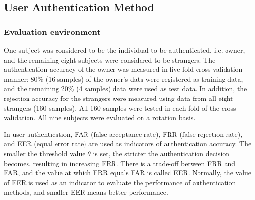 \documentclass[sigchi,authordraft]{acmart}
\begin{document}
\subsection{User Authentication Method}
\subsubsection{Evaluation environment}
One subject was considered to be the individual to be authenticated, i.e. owner, and the remaining eight subjects were considered to be strangers. The authentication accuracy of the owner was measured in five-fold cross-validation manner; 80\% (16 samples) of the owner's data were registered as training data, and the remaining 20\% (4 samples) data were used as test data. In addition, the rejection accuracy for the strangers were measured using data from all eight strangers (160 samples). All 160 samples were tested in each fold of the cross-validation. All nine subjects were evaluated on a rotation basis.\par


In user authentication, FAR (false acceptance rate), FRR (false rejection rate), and EER (equal error rate) are used as indicators of authentication accuracy. 
The smaller the threshold value $\theta$ is set, the stricter the authentication decision becomes, resulting in increasing FRR.
There is a trade-off between FRR and FAR, and the value at which FRR equals FAR is called EER. Normally, the value of EER is used as an indicator to evaluate the performance of authentication methods, and smaller EER means better performance.

\end{document}
